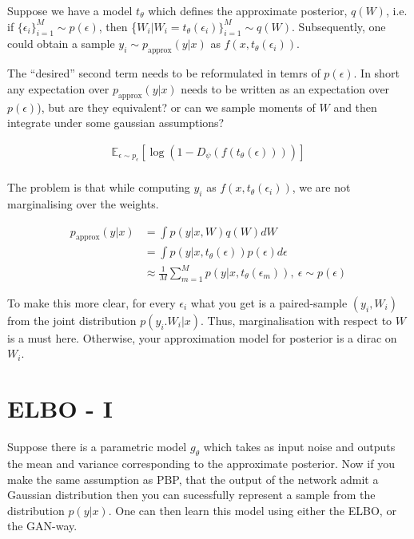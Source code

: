 \documentclass[twoside]{article}
\begin{document}
Suppose we have a model $t_\theta$ which defines the approximate posterior, $q(W)$, i.e. if $\{\epsilon_i\}_{i=1}^M \sim p(\epsilon)$, then \{$W_i | W_i = t_\theta(\epsilon_i)\}_{i=1}^M\sim q(W)$. Subsequently, one could obtain a sample $y_i \sim p_{\text{approx}}(y|x)$ as $f(x,t_\theta(\epsilon_i))$. 


The ``desired'' second term needs to be reformulated in temrs of $p(\epsilon)$. In short any expectation over $p_{\text{approx}}(y|x)$ needs to be written as an expectation over $p(\epsilon)$), but are they equivalent? or can we sample moments of $W$ and then integrate under some gaussian assumptions?

\begin{align}
\mathbb{E}_{\epsilon\sim p_{\epsilon}}[\log \left( 1-D_\psi(f(t_\theta(\epsilon))) \right) ]\\
\end{align}


The problem is that while computing $y_i$ as $f(x,t_\theta(\epsilon_i))$, we are not marginalising over the weights. 

\begin{align}
p_{\text{approx}}(y|x) &= \int p(y|x,W)q(W) dW\\
& = \int p(y|x,t_\theta(\epsilon))p(\epsilon)d\epsilon\\
&\approx \frac{1}{M} \sum_{m=1}^{M} p(y|x,t_\theta(\epsilon_m)), \ \epsilon \sim p(\epsilon)
\end{align}

To make this more clear, for every $\epsilon_i$ what you get is a paired-sample $(y_i,W_i)$ from the joint distribution $p(y_i.W_i|x)$. Thus, marginalisation with respect to $W$ is a must here. Otherwise, your approximation model for posterior is a dirac on $W_i$.


\section{ELBO - I}

Suppose there is a parametric model $g_\theta$ which takes as input noise and outputs the mean and variance corresponding to the approximate posterior. Now if you make the same assumption as PBP, that the output of the network admit a Gaussian distribution then you can sucessfully represent a sample from the distribution $p(y|x)$. One can then learn this model using either the ELBO, or the GAN-way.
\end{document}
